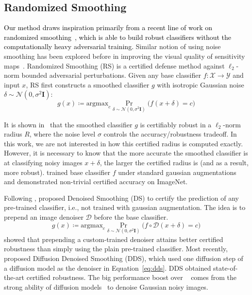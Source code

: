 \documentclass[10pt,twocolumn,letterpaper]{article}
\newcommand{\br}[1]{\left({#1}\right)}
\newcommand{\ms}[1]{\textcolor{black}{#1}}
\begin{document}
\subsection{Randomized Smoothing}
\ms{Our method draws inspiration primarily from a recent line of work on randomized smoothing~\cite{cohen2019certified,lecuyer2019dp}, which is able to build robust classifiers without the computationally heavy adversarial training.} Similar notion of using noise smoothing has been explored before in improving the visual quality of sensitivity maps~\cite{smilkov2017smoothgrad}. Randomized Smoothing (RS) is a certified defense method against $\ell_{2}$-norm bounded adversarial perturbations. Given any base classifier $f:\mathcal{X}\rightarrow\mathcal{Y}$ and input $x$, RS first constructs a smoothed classifier $g$ with isotropic Gaussian noise $\delta\sim\mathcal{N}(0,\sigma^{2}\mathbf{I})$:
\begin{equation}\label{eq:def_smoothing}
    g(x)\coloneqq \text{argmax}_{c}\Pr_{\delta \sim \mathcal{N}\br{0, \sigma^2 \mathbf{I}}}\big(f(x + \delta) = c\big)
\end{equation}

It is shown in~\cite{cohen2019certified} that the smoothed classifier $g$ is certifiably robust in a $\ell_{2}$-norm radius $R$, where the noise level $\sigma$ controls the accuracy/robustness tradeoff. In this work, we are not interested in how this certified radius is computed exactly. However, it is necessary to know that the more accurate the smoothed classifier is at classifying noisy images $x+\delta$, the larger the certified radius is (and as a result, more robust). \cite{cohen2019certified} trained base classifier $f$ under standard gaussian augmentations and demonstrated non-trivial certified accuracy on ImageNet.

Following \cite{cohen2019certified}, \cite{salman2020ds} proposed Denoised Smoothing (DS) to certify the prediction of any pre-trained classifier, i.e., not trained with gaussian augmentation. The idea is to prepend an image denoiser $\mathcal{D}$ before the base classifier.
\begin{equation}\label{eq:dds}
    g(x)\coloneqq \text{argmax}_{c}\Pr_{\delta \sim \mathcal{N}\br{0, \sigma^2 \mathbf{I}}}\big(f\circ \mathcal{D}(x + \delta) = c\big) 
\end{equation}
\cite{salman2020ds} showed that prepending a custom-trained denoiser attains better certified robustness than simply using the plain pre-trained classifier. Most recently, \cite{carlini2022free} proposed Diffusion Denoised Smoothing (DDS), which used one diffusion step of a diffusion model as the denoiser in Equation~\ref{eq:dds}. DDS obtained state-of-the-art certified robustness. The big performance boost over ~\cite{salman2020ds} comes from the strong ability of diffusion models~\cite{ho2020denoising} to denoise Gaussian noisy images. 
\end{document}
